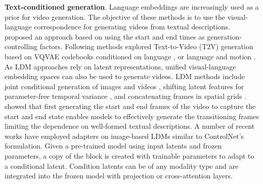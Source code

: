 \noindent
\textbf{Text-conditioned generation}. Language embeddings are increasingly used as a prior for video generation. The objective of these methods is to use the visual-language correspondence for generating videos from textual descriptions. \citet{dorkenwald2021stochastic} proposed an approach based on using the start and end times as generation-controlling factors. 
Following methods explored Text-to-Video (T2V) generation based on VQVAE codebooks conditioned on language \citep{han2022show,yan2021videogpt}, or language and motion \citep{hu2022make}. As LDM approaches rely on latent representations, unified visual-language embedding spaces can also be used to generate videos. LDM methods include joint conditional generation of images and videos \citep{gupta2023photorealistic}, shifting latent features for parameter-free temporal variance \citep{an2023latent}, and concatenating frames in spatial grids \citep{lee2024grid}. \citet{zeng2024make} showed that
first generating the start and end frames of the video to capture the start and end state enables models to effectively generate the transitioning frames limiting the dependence on well-formed textual descriptions. A number of recent works \citep{fei2024dysen,tian2024videotetris,wang2023videocomposer,wang2024recipe,wei2024dreamvideo,zhuang2024vlogger} have employed adapters on image-based LDMs similar to ControlNet's \citep{zhang2023adding} formulation. Given a pre-trained model using input latents and frozen parameters, a copy of the block is created with trainable parameters to adapt to a conditional latent. Condition latents can be of any modality type and are integrated into the frozen model with projection or cross-attention layers.




